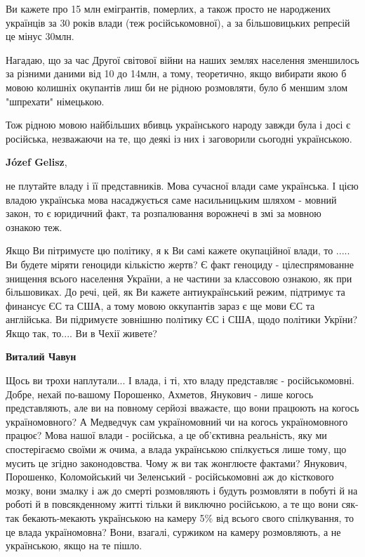 \begin{itemize}
\begin{itemize}
Ви кажете про 15 млн емігрантів, померлих, а також просто не народжених
українців за 30 років влади (теж російськомовної), а за більшовицьких репресій
це мінус 30млн. 

Нагадаю, що за час Другої світової війни на наших землях населення зменшилось
за різними даними від 10 до 14млн, а тому, теоретично, якщо вибирати якою б
мовою колишніх окупантів лиш би не рідною розмовляти, було б меншим злом
"шпрехати" німецькою.

Тож рідною мовою найбільших вбивць українського народу завжди була і досі є
російська, незважаючи на те, що деякі із них і заговорили сьогодні українською.


\textbf{Józef Gelisz}, 

не плутайте владу і її представників. Мова сучасної влади саме українська. І
цією владою українська мова насаджується саме насильницьким шляхом - мовний
закон, то є юридичний факт, та розпалювання ворожнечі в змі за мовною ознакою
теж. 

Якщо Ви пітримуєте цю політику, я к Ви самі кажете окупаційної влади, то
..... Ви будете міряти геноциди кількістю жертв? Є факт геноциду -
цілеспрямованне знищення всього населення України, а не частини за классовою
ознакою, як при більшовиках. До речі, цей, як Ви кажете антиукраїнський
режим, підтримує та финансує ЄС та США, а тому мовою оккупантів зараз є ще
мови ЄС та англійська. Ви підримуєте зовнішню політику ЄС і США, щодо політики
Укрїни? Якщо так, то.... Ви в Чехії живете?


\textbf{Виталий Чавун} 

Щось ви трохи наплутали... І влада, і ті, хто владу
представляє - російськомовні. Добре, нехай по-вашому Порошенко, Ахметов,
Янукович - лише когось представляють, але ви на повному серйозі вважаєте, що
вони працюють на когось україномовного? А Медведчук сам україномовний чи на
когось україномовного працює? Мова нашої влади - російська, а це об'єктивна
реальність, яку ми спостерігаємо своїми ж очима, а влада українською
спілкується лише тому, що мусить це згідно законодовства. Чому ж ви так
жонглюєте фактами? Янукович, Порошенко, Коломойський чи Зеленський -
російськомовні аж до кісткового мозку, вони змалку і аж до смерті розмовляють і
будуть розмовляти в побуті й на роботі й в повсякденному житті тільки й
виключно російською, а те що вони сяк-так бекають-мекають українською на камеру
5\% від всього свого спілкування, то це влада україномовна? Вони, взагалі,
суржиком на камеру розмовляють, а не українською, якщо на те пішло.




\end{itemize}
\end{itemize}
